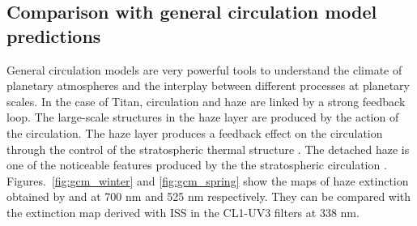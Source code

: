 \subsection{Comparison with general circulation model predictions}

General circulation models are very powerful tools to understand the climate of planetary atmospheres and the
interplay between different processes at planetary scales. In the case of Titan, circulation and haze are linked
by a strong feedback loop. The large-scale structures in the haze layer are produced by the action of the
circulation. The haze layer produces a feedback effect on the circulation through the control of the stratospheric
thermal structure \citep{Rannou2004}. The detached haze is one of the noticeable features produced by the the
stratospheric circulation \citep{Rannou2002, Lebonnois2012, Larson2015}. Figures.~\ref{fig:gcm_winter}
and \ref{fig:gcm_spring} show the maps of haze extinction obtained by \cite{Lebonnois2012} and
\cite{Larson2015} at 700 nm and 525 nm respectively. They can be compared with the extinction map derived
with ISS in the CL1-UV3 filters at 338 nm.

\begin{figure*}[!ht]
\caption{Zonally-averaged haze extinction at northern winter solstice
($L_s = \ang{270}$) estimated by \cite{Lebonnois2012} at the wavelength $\lambda = $ 700 nm 
and by \cite{Larson2015} at $\lambda = $ 525 nm .  Haze extinction map
retrieved from Cassini/ISS observation CL1-UV3 ($\lambda = $ 338 nm) in the middle of winter
(N1477222048\_2 - $L_s = \ang{300}$).}
\label{fig:gcm_winter}
\end{figure*}

